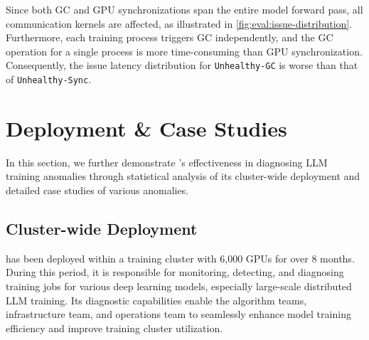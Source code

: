Since both GC and GPU synchronizations span the entire model forward pass, all communication kernels are affected, as illustrated in \autoref{fig:eval:issue-distribution}. Furthermore, each training process triggers GC independently, and the GC operation for a single process is more time-consuming than GPU synchronization. Consequently, the issue latency distribution for \texttt{Unhealthy-GC} is worse than that of \texttt{Unhealthy-Sync}.


\section{Deployment \& Case Studies}
\label{sec:case_study}
In this section, we further demonstrate \sysname{}’s effectiveness in diagnosing LLM training anomalies through statistical analysis of its cluster-wide deployment and detailed case studies of various anomalies.

\subsection{Cluster-wide Deployment}

\sysname{} has been deployed within a training cluster with 6,000 GPUs for over 8 months.
During this period, it is responsible for monitoring, detecting, and diagnosing training jobs for various deep learning models, especially large-scale distributed LLM training.
Its diagnostic capabilities enable the algorithm teams, infrastructure team, and operations team to seamlessly enhance model training efficiency and improve training cluster utilization.

